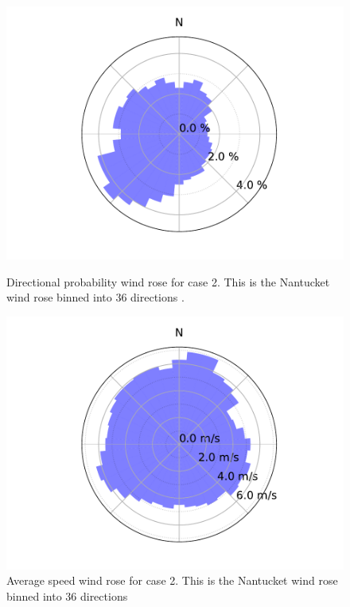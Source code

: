 \documentclass[a4paper]{jpconf}
\begin{document}
\begin{figure}[h!]
\centering
\begin{minipage}[t]{18pc}
\centering
\includegraphics[width=\textwidth, trim={1.5cm 0cm 1.5cm 0cm}, clip]{final_images/windroses/freqwindrose_36_dir.pdf}
\caption{Directional probability wind rose for case 2. This is the Nantucket wind rose binned into 36 directions \cite{wrcc2017}.}
\label{fig:freqwindrose_36dir}
\end{minipage} \hspace{1pc}%
\begin{minipage}[t]{18pc}
	\centering
	\includegraphics[width=\textwidth, trim={1.5cm, 0cm, 1.5cm, 0cm}, clip]{final_images/windroses/speedwindrose_36_dir.pdf}
	\caption{Average speed wind rose for case 2. This is the Nantucket wind rose binned into 36 directions \cite{wrcc2017}}
	\label{fig:speedwindrose_36dir}
\end{minipage}
\end{figure}
\end{document}
